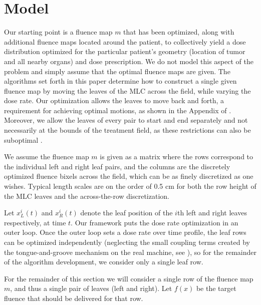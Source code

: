 \documentclass[12pt]{article}
\begin{document}
\section{Model}
\label{sec:model}

Our starting point is a fluence map $m$
that has been optimized, along with additional fluence maps located around the patient, to collectively yield a dose distribution optimized for the particular patient's geometry (location of tumor and all nearby organs) and dose prescription. We do not model this aspect of the problem and simply assume that the optimal fluence maps are given. The algorithms set forth in this paper determine how to construct a single given fluence map by moving the leaves of the MLC across the field, while varying the dose rate.
Our optimization allows the leaves to move back and forth, a requirement for achieving optimal motions, as shown in the Appendix of \cite{balvertcraft}.
Moreover, we allow the leaves of every pair to start and end separately and not necessarily at the bounds of the treatment field, as these restrictions can also be suboptimal \cite{thesisKvA}.

We assume the fluence map $m$ is given as a matrix where the rows correspond to the individual left and right leaf pairs, and the columns are the discretely optimized fluence bixels across the field, which can be as finely discretized as one wishes. Typical length scales are on the order of 0.5 cm for both the row height of the MLC leaves and the across-the-row discretization.

Let $x^i_L(t)$ and $x^i_R(t)$ denote the leaf position of the $i$th left and right leaves respectively, at time $t$.
Our framework puts the dose rate optimization in an outer loop. Once the outer loop sets a dose rate over time profile, the leaf rows can be optimized independently (neglecting the small coupling terms created by the tongue-and-groove mechanism on the real machine, see \cite{unkvmatreview}), so for the remainder of the algorithm development, we consider only a single leaf row.

For the remainder of this section we will consider a single row of the fluence map $m$, and thus a single pair of leaves (left and right). Let $f(x)$ be the target fluence that should be delivered for that row.

\end{document}
